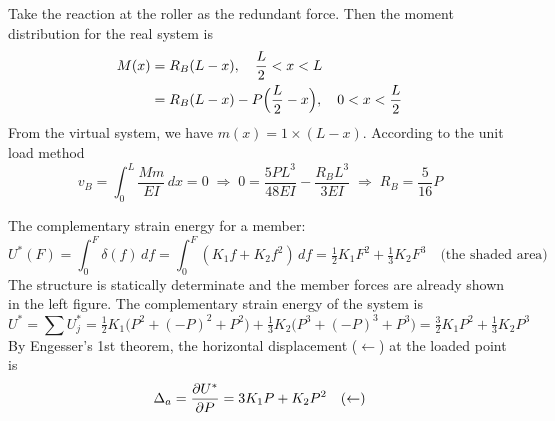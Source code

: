 \begin{example}
\leavevmode
\begin{fig}
  
\end{fig}
Take the reaction at the roller as the redundant force. Then the moment distribution for the real system is
\begin{align*}
  M(x) &= R_B(L-x),\quad \frac L2 < x < L\\
       &= R_B(L-x) - P\Bigl(\frac L2 - x\Bigr),\quad 0 < x < \frac L2
\end{align*}
From the virtual system, we have $m(x) = 1\times(L-x)$. According to the unit load method
\begin{equation*}
  v_B = \int_0^L\frac{Mm}{EI}\,dx = 0 \;\Rightarrow\; 0 = \frac{5PL^3}{48EI} - \frac{R_BL^3}{3EI} \;\Rightarrow\; R_B = \frac{5}{16}P
\end{equation*}
\begin{fig}
  
\end{fig}
\end{example}

\begin{example}
\leavevmode
\begin{fig}
  
\end{fig}
The complementary strain energy for a member:
\begin{equation*}
  U^*(F) = \int_0^F\delta(f)\,df = \int_0^F(K_1f + K_2f^2)\,df = \tfrac12K_1F^2 + \tfrac13K_2F^3\quad\text{(the shaded area)}
\end{equation*}
The structure is statically determinate and the member forces are already shown in the left figure. The complementary strain energy of the system is
\begin{equation*}
  U^* = \sum U^*_j = \tfrac12K_1\bigl(P^2 + (-P)^2 + P^2\bigr) + \tfrac13K_2\bigl(P^3 + (-P)^3 + P^3\bigr) = \tfrac32K_1P^2 + \tfrac13K_2P^3
\end{equation*}
By Engesser's 1st theorem, the horizontal displacement ($\leftarrow$) at the loaded point is
\begin{equation*}
  \Delta_a = \frac{\partial U^*}{\partial P} = 3K_1P + K_2P^2\quad(\leftarrow)
\end{equation*}
\end{example}


